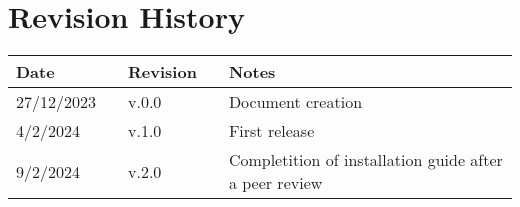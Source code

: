 \chapter*{Revision History}

\begin{table}[h]
    \centering
    \begin{tabular}{l p{2.5cm} l p{2.5cm} p{4cm}}
        \hline
        \textbf{Date} &  & \textbf{Revision} &  & \textbf{Notes}                                         \\ \hline
        27/12/2023    &  & v.0.0             &  & Document creation                                      \\
        4/2/2024      &  & v.1.0             &  & First release                                          \\
        9/2/2024      &  & v.2.0             &  & Completition of installation guide after a peer review \\
        \hline
    \end{tabular}
\end{table}

\newpage
